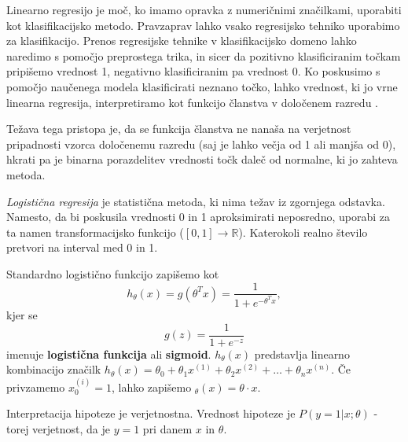 \documentclass[11pt,a4paper,openany]{book}
\begin{document}
Linearno regresijo je moč, ko imamo opravka z numeričnimi značilkami, uporabiti kot klasifikacijsko metodo. Pravzaprav lahko vsako regresijsko tehniko uporabimo za klasifikacijo. Prenos regresijske tehnike v klasifikacijsko domeno lahko naredimo s pomočjo preprostega trika, in sicer da pozitivno klasificiranim točkam pripišemo vrednost 1, negativno klasificiranim pa vrednost 0. Ko poskusimo s pomočjo naučenega modela klasificirati neznano točko, lahko vrednost, ki jo vrne linearna regresija, interpretiramo kot funkcijo članstva v določenem razredu \cite{Witten2005}.

Težava tega pristopa je, da se funkcija članstva ne nanaša na verjetnost pripadnosti vzorca določenemu razredu (saj je lahko večja od 1 ali manjša od 0), hkrati pa je binarna porazdelitev vrednosti točk daleč od normalne, ki jo zahteva metoda.

\textit{Logistična regresija} je statistična metoda, ki nima težav iz zgornjega odstavka. Namesto, da bi poskusila vrednosti 0 in 1 aproksimirati neposredno, uporabi za ta namen transformacijsko funkcijo ($[0, 1] \rightarrow \mathbb{R}$). Katerokoli realno število pretvori na interval med 0 in 1.

Standardno logistično funkcijo zapišemo kot
\begin{equation}
	\label{en:standardna_log_funkcija}
	h_\theta(x) = g(\theta^Tx) = \frac{1}{1 + e^{-\theta^Tx}},
\end{equation}
kjer se
\begin{equation}
	g(z) = \frac{1}{1 + e^{-z}}
\end{equation}
imenuje \textbf{logistična funkcija} ali \textbf{sigmoid}. $h_\theta(x)$ predstavlja linearno kombinacijo značilk $h_\theta(x) = \theta_0 + \theta_1x^{(1)} + \theta_2x^{(2)} + \dots + \theta_nx^{(n)}$. Če privzamemo $x_0^{(i)} = 1$, lahko zapišemo $_\theta(x) = \theta \cdot x$.

Interpretacija hipoteze je verjetnostna. Vrednost hipoteze je $P(y=1|x;\theta)$ - torej verjetnost, da je $y = 1$ pri danem $x$ in $\theta$.
\end{document}
